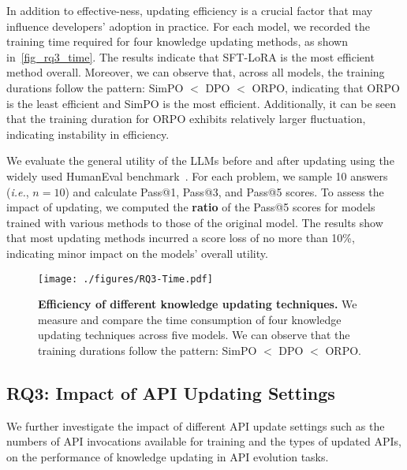 In addition to effective-ness, updating efficiency is a crucial factor that may influence developers' adoption in practice. For each model, we recorded the training time required for four knowledge updating methods, as shown in~\autoref{fig_rq3_time}. The results indicate that SFT-LoRA is the most efficient method overall. Moreover, we can observe that, across all models, the training durations follow the pattern: SimPO $<$ DPO $<$ ORPO, indicating that ORPO is the least efficient and SimPO is the most efficient. Additionally, it can be seen that the training duration for ORPO exhibits relatively larger fluctuation, indicating instability in efficiency.

We evaluate the general utility of the LLMs before and after updating using the widely used HumanEval benchmark~\cite{chen2021humaneval}. For each problem, we sample 10 answers (\emph{i.e.}, $n=10$) and calculate Pass@1, Pass@3, and Pass@5 scores. To assess the impact of updating, we computed the \textbf{ratio} of the Pass@5 scores for models trained with various methods to those of the original model. The results show that most updating methods incurred a score loss of no more than 10\%, indicating minor impact on the models' overall utility.

\begin{figure}[!t]
	\centering
	\texttt{[image: ./figures/RQ3-Time.pdf]}
         \vspace{-1.5em}
         \caption{\textbf{Efficiency of different knowledge updating techniques.} We measure and compare the time consumption of four knowledge updating techniques across five models. We can observe that the training durations follow the pattern: SimPO $<$ DPO $<$ ORPO.}
	\label{fig_rq3_time}
	\vspace{-1em}
\end{figure}

\subsection{RQ3: Impact of API Updating Settings}
We further investigate the impact of different API update settings such as the numbers of API invocations available for training and the types of updated APIs, on the performance of knowledge updating in API evolution tasks.

